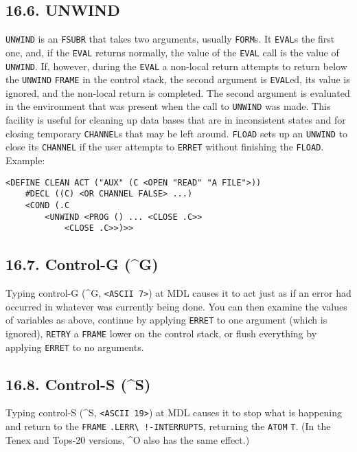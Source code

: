 \documentclass[a4paper,]{article}
\begin{document}
\subsection{16.6. UNWIND}\label{unwind}

 \texttt{UNWIND} is an \texttt{FSUBR} that takes two arguments, usually
\texttt{FORM}s. It \texttt{EVAL}s the first one, and, if the \texttt{EVAL} returns normally, the value of the \texttt{EVAL}
call is the value of \texttt{UNWIND}. If, however, during the \texttt{EVAL} a non-local return attempts to return below the
\texttt{UNWIND} \texttt{FRAME} in the control stack, the second argument is \texttt{EVAL}ed, its value is ignored, and the
non-local return is completed. The second argument is evaluated in the environment that was present when the call to
\texttt{UNWIND} was made. This facility is useful for cleaning up data bases that are in inconsistent states and for
closing temporary \texttt{CHANNEL}s that may be left around. \texttt{FLOAD} sets up an
\texttt{UNWIND} to close its \texttt{CHANNEL} if the user attempts to \texttt{ERRET} without finishing the \texttt{FLOAD}.
Example:

\begin{verbatim}
<DEFINE CLEAN ACT ("AUX" (C <OPEN "READ" "A FILE">))
    #DECL ((C) <OR CHANNEL FALSE> ...)
    <COND (.C
        <UNWIND <PROG () ... <CLOSE .C>>
            <CLOSE .C>>)>>
\end{verbatim}

\subsection{16.7. Control-G (\^{}G)}\label{control-g-g}

 Typing control-G (\^{}G, \texttt{\textless{}ASCII\ 7\textgreater{}}) at MDL causes it to act
just as if an error had occurred in whatever was currently being done. You can then examine the values of variables as
above, continue by applying \texttt{ERRET} to one argument (which is ignored), \texttt{RETRY} a \texttt{FRAME} lower on the
control stack, or flush everything by applying \texttt{ERRET} to no arguments.

\subsection{16.8. Control-S (\^{}S)}\label{control-s-s}

 Typing control-S (\^{}S, \texttt{\textless{}ASCII\ 19\textgreater{}}) at MDL causes it to
stop what is happening and return to the \texttt{FRAME}
\texttt{.LERR\textbackslash{}\ !-INTERRUPTS}, returning the \texttt{ATOM} \texttt{T}.
(In the Tenex and Tops-20 versions, \^{}O also
has the same effect.)
\end{document}
